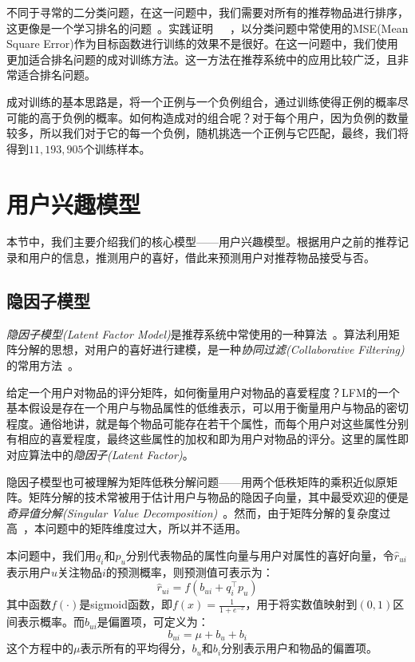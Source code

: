 \documentclass[12pt]{article} %
\newcommand\qq{\boldsymbol{\mathit{q}}}
\newcommand\pp{\boldsymbol{\mathit{p}}}
\begin{document}
\begin{sloppypar}
不同于寻常的二分类问题，在这一问题中，我们需要对所有的推荐物品进行排序，这更像是一个学习排名的问题~\cite{liu2009learning}。实践证明~\cite{furnkranz2003pairwise}~\cite{rendle2014improving}~\cite{sharma2013pairwise}，以分类问题中常使用的MSE(Mean Square Error)作为目标函数进行训练的效果不是很好。在这一问题中，我们使用更加适合排名问题的成对训练方法。这一方法在推荐系统中的应用比较广泛，且非常适合排名问题。

成对训练的基本思路是，将一个正例与一个负例组合，通过训练使得正例的概率尽可能的高于负例的概率。如何构造成对的组合呢？对于每个用户，因为负例的数量较多，所以我们对于它的每一个负例，随机挑选一个正例与它匹配，最终，我们将得到$11,193,905$个训练样本。


\section{用户兴趣模型}

本节中，我们主要介绍我们的核心模型——用户兴趣模型。根据用户之前的推荐记录和用户的信息，推测用户的喜好，借此来预测用户对推荐物品接受与否。

\subsection{隐因子模型}

{\em 隐因子模型(Latent Factor Model)}是推荐系统中常使用的一种算法~\cite{koren2009matrix}。算法利用矩阵分解的思想，对用户的喜好进行建模，是一种{\em 协同过滤(Collaborative Filtering)}的常用方法~\cite{shen2012learning}。

给定一个用户对物品的评分矩阵，如何衡量用户对物品的喜爱程度？LFM的一个基本假设是存在一个用户与物品属性的低维表示，可以用于衡量用户与物品的密切程度。通俗地讲，就是每个物品可能存在若干个属性，而每个用户对这些属性分别有相应的喜爱程度，最终这些属性的加权和即为用户对物品的评分。这里的属性即对应算法中的{\em 隐因子(Latent Factor)}。

隐因子模型也可被理解为矩阵低秩分解问题——用两个低秩矩阵的乘积近似原矩阵。矩阵分解的技术常被用于估计用户与物品的隐因子向量，其中最受欢迎的便是{\em 奇异值分解(Singular Value Decomposition)}~\cite{kleibergen2006generalized}。然而，由于矩阵分解的复杂度过高~\cite{klema1980singular}，本问题中的矩阵维度过大，所以并不适用。

本问题中，我们用$\qq_i$和$\pp_u$分别代表物品的属性向量与用户对属性的喜好向量，令$\hat{r}_{ui}$表示用户$u$关注物品$i$的预测概率，则预测值可表示为：
\begin{equation}
	\hat{r}_{ui} = f(b_{ui} + \qq_i^\top \pp_u)
\end{equation}
其中函数$f(\cdot)$是sigmoid函数，即$f(x) = \frac{1}{1 + e^{-x}}$，用于将实数值映射到$(0,1)$区间表示概率。而$b_{ui}$是偏置项，可定义为：
\begin{equation}
	b_{ui} = \mu + b_u + b_i
\end{equation}
这个方程中的$\mu$表示所有的平均得分，$b_u$和$b_i$分别表示用户和物品的偏置项。


\end{sloppypar}
\end{document}
